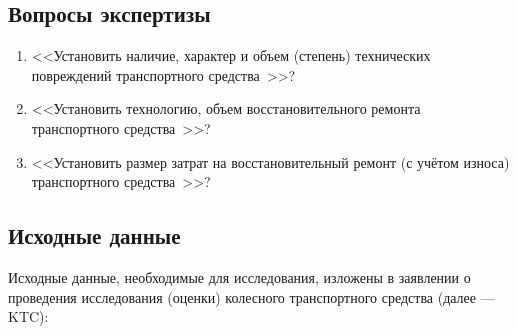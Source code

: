 \setcounter{page}{1}
\subsection{Вопросы экспертизы}
\begin{enumerate}
\item  <<Установить наличие, характер и объем (степень) технических повреждений транспортного средства  \tc \,>>?\\[-2mm]
\item <<Установить технологию, объем восстановительного  ремонта транспортного средства \tc \,>>?\\[-2mm]
\item <<Установить размер затрат на восстановительный ремонт (с учётом износа) транспортного средства \tc \,>>?\\[-2mm]
%	
\end{enumerate}
\subsection{Исходные данные} %
Исходные  данные,  необходимые  для   исследования,  изложены   в  заявлении о проведения исследования  (оценки)  колесного  транспортного  средства (далее —  KTC):

